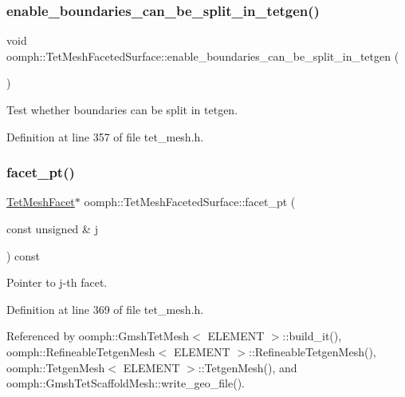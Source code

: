 \subsubsection{\texorpdfstring{enable\+\_\+boundaries\+\_\+can\+\_\+be\+\_\+split\+\_\+in\+\_\+tetgen()}{enable\_boundaries\_can\_be\_split\_in\_tetgen()}}
{\footnotesize\ttfamily void oomph\+::\+Tet\+Mesh\+Faceted\+Surface\+::enable\+\_\+boundaries\+\_\+can\+\_\+be\+\_\+split\+\_\+in\+\_\+tetgen (\begin{DoxyParamCaption}{ }\end{DoxyParamCaption})\hspace{0.3cm}{\ttfamily [inline]}}



Test whether boundaries can be split in tetgen. 



Definition at line 357 of file tet\+\_\+mesh.\+h.

\mbox{\label{classoomph_1_1TetMeshFacetedSurface_a901cc7080454c9b93ceccce863e08a4c}} 
\subsubsection{\texorpdfstring{facet\+\_\+pt()}{facet\_pt()}}
{\footnotesize\ttfamily \hyperlink{classoomph_1_1TetMeshFacet}{Tet\+Mesh\+Facet}$\ast$ oomph\+::\+Tet\+Mesh\+Faceted\+Surface\+::facet\+\_\+pt (\begin{DoxyParamCaption}\item[{const unsigned \&}]{j }\end{DoxyParamCaption}) const\hspace{0.3cm}{\ttfamily [inline]}}



Pointer to j-\/th facet. 



Definition at line 369 of file tet\+\_\+mesh.\+h.



Referenced by oomph\+::\+Gmsh\+Tet\+Mesh$<$ E\+L\+E\+M\+E\+N\+T $>$\+::build\+\_\+it(), oomph\+::\+Refineable\+Tetgen\+Mesh$<$ E\+L\+E\+M\+E\+N\+T $>$\+::\+Refineable\+Tetgen\+Mesh(), oomph\+::\+Tetgen\+Mesh$<$ E\+L\+E\+M\+E\+N\+T $>$\+::\+Tetgen\+Mesh(), and oomph\+::\+Gmsh\+Tet\+Scaffold\+Mesh\+::write\+\_\+geo\+\_\+file().

